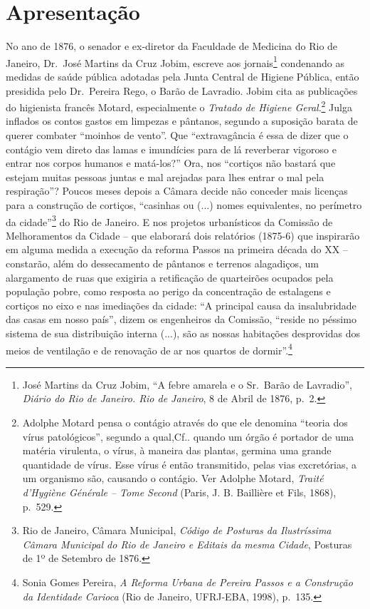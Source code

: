 \hypertarget{apresentauxe7uxe3o}{%
\chapter{Apresentação}\label{apresentauxe7uxe3o}}

No ano de 1876, o senador e ex-diretor da Faculdade de Medicina do Rio
de Janeiro, Dr.~José Martins da Cruz Jobim, escreve aos
jornais\footnote{José Martins da Cruz Jobim, ``A febre amarela e o
  Sr.~Barão de Lavradio'', \emph{Diário do Rio de Janeiro. Rio de
  Janeiro}, 8 de Abril de 1876, p.~2.} condenando as medidas de saúde
pública adotadas pela Junta Central de Higiene Pública, então presidida
pelo Dr.~Pereira Rego, o Barão de Lavradio. Jobim cita as publicações do
higienista francês Motard, especialmente o \emph{Tratado de Higiene
Geral}.\footnote{Adolphe Motard pensa o contágio através do que ele
  denomina ``teoria dos vírus patológicos'', segundo a qual,Cf.. quando
  um órgão é portador de uma matéria virulenta, o vírus, à maneira das
  plantas, germina uma grande quantidade de vírus. Esse vírus é então
  transmitido, pelas vias excretórias, a um organismo são, causando o
  contágio. Ver Adolphe Motard, \emph{Traité d'Hygiène Générale -- Tome
  Second} (Paris, J. B. Baillière et Fils, 1868), p.~529.} Julga
inflados os contos gastos em limpezas e pântanos, segundo a suposição
barata de querer combater ``moinhos de vento''. Que ``extravagância é
essa de dizer que o contágio vem direto das lamas e imundícies para de
lá reverberar vigoroso e entrar nos corpos humanos e matá-los?'' Ora,
nos ``cortiços não bastará que estejam muitas pessoas juntas e mal
arejadas para lhes entrar o mal pela respiração''? Poucos meses depois a
Câmara decide não conceder mais licenças para a construção de cortiços,
``casinhas ou (...) nomes equivalentes, no perímetro da
cidade''\footnote{Rio de Janeiro, Câmara Municipal, \emph{Código de
  Posturas da Ilustríssima Câmara Municipal do Rio de Janeiro e Editais
  da mesma Cidade}, Posturas de 1º de Setembro de 1876.} do Rio de
Janeiro. E nos projetos urbanísticos da Comissão de Melhoramentos da
Cidade -- que elaborará dois relatórios (1875-6) que inspirarão em
alguma medida a execução da reforma Passos na primeira década do XX --
constarão, além do dessecamento de pântanos e terrenos alagadiços, um
alargamento de ruas que exigiria a retificação de quarteirões ocupados
pela população pobre, como resposta ao perigo da concentração de
estalagens e cortiços no eixo e nas imediações da cidade: ``A principal
causa da insalubridade das casas em nosso país'', dizem os engenheiros
da Comissão, ``reside no péssimo sistema de sua distribuição interna
(...), são as nossas habitações desprovidas dos meios de ventilação e de
renovação de ar nos quartos de dormir''.\footnote{Sonia Gomes Pereira,
  \emph{A Reforma Urbana de Pereira Passos e a Construção da Identidade
  Carioca} (Rio de Janeiro, UFRJ-EBA, 1998), p.~135.}

